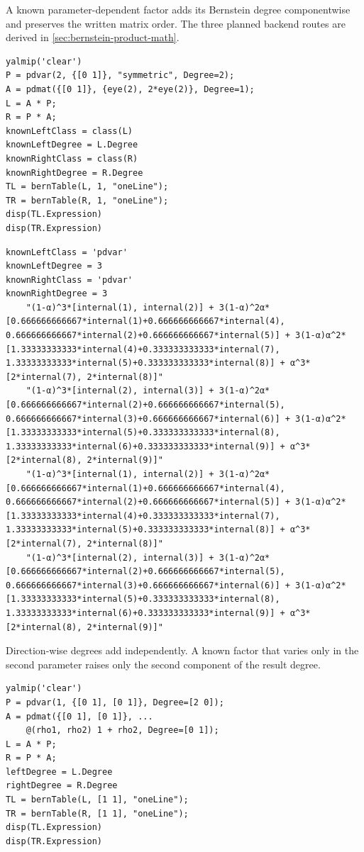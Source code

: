 A known parameter-dependent factor adds its Bernstein degree componentwise and preserves the written matrix order. The three planned backend routes are derived in \cref{sec:bernstein-product-math}.

\begin{lstlisting}[style=dpmatlab]
yalmip('clear')
P = pdvar(2, {[0 1]}, "symmetric", Degree=2);
A = pdmat({[0 1]}, {eye(2), 2*eye(2)}, Degree=1);
L = A * P;
R = P * A;
knownLeftClass = class(L)
knownLeftDegree = L.Degree
knownRightClass = class(R)
knownRightDegree = R.Degree
TL = bernTable(L, 1, "oneLine");
TR = bernTable(R, 1, "oneLine");
disp(TL.Expression)
disp(TR.Expression)
\end{lstlisting}

\begin{lstlisting}[style=dpwideoutput]
knownLeftClass = 'pdvar'
knownLeftDegree = 3
knownRightClass = 'pdvar'
knownRightDegree = 3
    "(1-α)^3*[internal(1), internal(2)] + 3(1-α)^2α*[0.666666666667*internal(1)+0.666666666667*internal(4), 0.666666666667*internal(2)+0.666666666667*internal(5)] + 3(1-α)α^2*[1.33333333333*internal(4)+0.333333333333*internal(7), 1.33333333333*internal(5)+0.333333333333*internal(8)] + α^3*[2*internal(7), 2*internal(8)]"
    "(1-α)^3*[internal(2), internal(3)] + 3(1-α)^2α*[0.666666666667*internal(2)+0.666666666667*internal(5), 0.666666666667*internal(3)+0.666666666667*internal(6)] + 3(1-α)α^2*[1.33333333333*internal(5)+0.333333333333*internal(8), 1.33333333333*internal(6)+0.333333333333*internal(9)] + α^3*[2*internal(8), 2*internal(9)]"
    "(1-α)^3*[internal(1), internal(2)] + 3(1-α)^2α*[0.666666666667*internal(1)+0.666666666667*internal(4), 0.666666666667*internal(2)+0.666666666667*internal(5)] + 3(1-α)α^2*[1.33333333333*internal(4)+0.333333333333*internal(7), 1.33333333333*internal(5)+0.333333333333*internal(8)] + α^3*[2*internal(7), 2*internal(8)]"
    "(1-α)^3*[internal(2), internal(3)] + 3(1-α)^2α*[0.666666666667*internal(2)+0.666666666667*internal(5), 0.666666666667*internal(3)+0.666666666667*internal(6)] + 3(1-α)α^2*[1.33333333333*internal(5)+0.333333333333*internal(8), 1.33333333333*internal(6)+0.333333333333*internal(9)] + α^3*[2*internal(8), 2*internal(9)]"
\end{lstlisting}

Direction-wise degrees add independently. A known factor that varies only in the second parameter raises only the second component of the result degree.

\begin{lstlisting}[style=dpmatlab]
yalmip('clear')
P = pdvar(1, {[0 1], [0 1]}, Degree=[2 0]);
A = pdmat({[0 1], [0 1]}, ...
    @(rho1, rho2) 1 + rho2, Degree=[0 1]);
L = A * P;
R = P * A;
leftDegree = L.Degree
rightDegree = R.Degree
TL = bernTable(L, [1 1], "oneLine");
TR = bernTable(R, [1 1], "oneLine");
disp(TL.Expression)
disp(TR.Expression)
\end{lstlisting}

